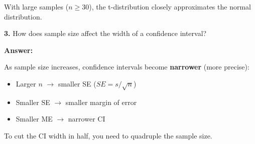 \documentclass[11pt]{article}
\begin{document}
With large samples ($n \geq 30$), the t-distribution closely approximates the normal distribution.

\vspace{0.5cm}

\textbf{3.} How does sample size affect the width of a confidence interval?

\textcolor{correctgreen}{\textbf{Answer:}}

As sample size increases, confidence intervals become \textbf{narrower} (more precise):
\begin{itemize}
\item Larger $n$ $\rightarrow$ smaller SE ($SE = s/\sqrt{n}$)
\item Smaller SE $\rightarrow$ smaller margin of error
\item Smaller ME $\rightarrow$ narrower CI
\end{itemize}

To cut the CI width in half, you need to quadruple the sample size.
\end{document}
